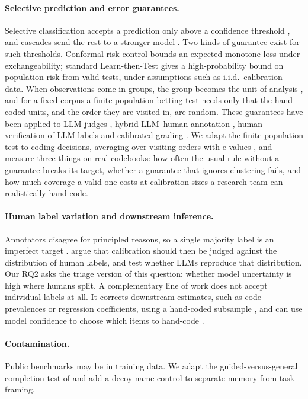 \paragraph{Selective prediction and error guarantees.} Selective classification accepts a prediction only above a
confidence threshold \citep{geifman2017selective}, and cascades send the rest to a stronger model \citep{chen2024frugalgpt}.
Two kinds of guarantee exist for such thresholds. Conformal risk control \citep{angelopoulos2024crc} bounds an expected
monotone loss under exchangeability; standard Learn-then-Test \citep{angelopoulos2025ltt} gives a high-probability bound on
population risk from valid tests, under assumptions such as i.i.d.\ calibration data. When observations come in groups, the
group becomes the unit of analysis \citep{dunn2023hierarchical}, and for a fixed corpus a finite-population betting test
\citep{waudbysmith2024betting} needs only that the hand-coded units, and the order they are visited in, are random. These
guarantees have been applied to LLM judges \citep{jung2025trust,badshah2026judge,li2026localize}, hybrid LLM--human annotation
\citep{zeng2026hypac}, human verification of LLM labels \citep{wang2024human} and calibrated grading
\citep{raikote2026chillgrader}. We adapt the finite-population test to coding decisions, averaging over visiting orders with
e-values \citep{vovk2021evalues}, and measure three things on real codebooks: how often the usual rule without a guarantee
breaks its target, whether a guarantee that ignores clustering fails, and how much coverage a valid one costs at calibration
sizes a research team can realistically hand-code.

\paragraph{Human label variation and downstream inference.} Annotators disagree for principled reasons, so a single
majority label is an imperfect target \citep{plank2022problem,uma2021learning}. \citet{baan2022stop} argue that
calibration should then be judged against the distribution of human labels, and \citet{lee2023dissenting} test whether LLMs
reproduce that distribution. Our RQ2 asks the triage version of this question: whether model uncertainty is high where
humans split. A complementary line of work does not accept individual labels at all. It corrects downstream estimates,
such as code prevalences or regression coefficients, using a hand-coded subsample
\citep{angelopoulos2023ppi,egami2023using}, and can use model confidence to choose which items to hand-code
\citep{gligoric2025unconfident}.

\paragraph{Contamination.} Public benchmarks may be in training data. We adapt the guided-versus-general completion test of
\citet{golchin2024time} and add a decoy-name control to separate memory from task framing.
